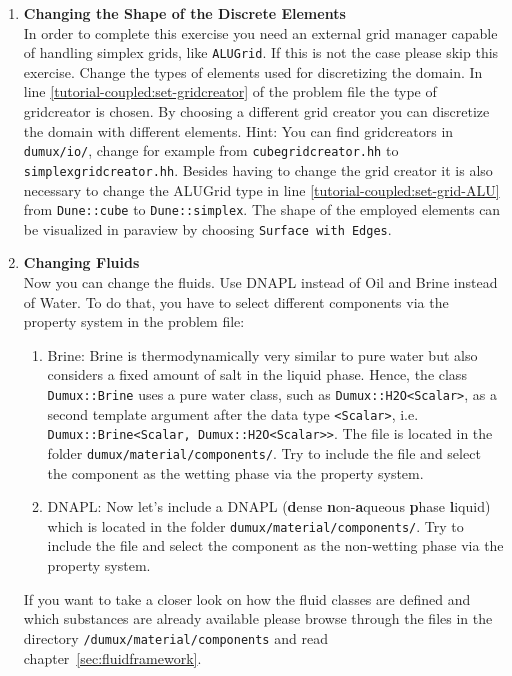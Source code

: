 \begin{enumerate}
  \item \textbf{Changing  the Shape of the Discrete Elements} \\
  In order to complete this exercise you need an external grid manager capable of handling 
  simplex grids, like \texttt{ALUGrid}. If this is not the case please skip this exercise.
  Change the types of elements used for discretizing the domain. In line \ref{tutorial-coupled:set-gridcreator} of the problem 
  file  the type of gridcreator is chosen. By choosing a different grid creator you can discretize the domain with different elements. 
  Hint: You can find gridcreators in \texttt{dumux/io/}, change for example from \texttt{cubegridcreator.hh} to \texttt{simplexgridcreator.hh}. 
  Besides having to change the grid creator it is also necessary to change the ALUGrid type in line \ref{tutorial-coupled:set-grid-ALU} from \texttt{Dune::cube} 
  to \texttt{Dune::simplex}.
  The shape of the employed elements can be visualized in paraview by choosing \texttt{Surface with Edges}. 

\item \textbf{Changing Fluids} \\
Now you can change the fluids. Use DNAPL instead of Oil and Brine instead of Water. To do that, you have to select different components via the property system in the problem file:
\begin{enumerate}
 \item Brine: Brine is thermodynamically very similar to pure water but also considers a fixed amount of salt in the liquid phase. 
  Hence, the class \texttt{Dumux::Brine} uses a pure water class, such as \texttt{Dumux::H2O<Scalar>}, 
  as a second template argument after the data type \texttt{<Scalar>}, i.e. \texttt{Dumux::Brine<Scalar, Dumux::H2O<Scalar>>}. The file is located in the folder \texttt{dumux/material/components/}.
  Try to include the file and select the component as the wetting phase via the property system.
 \item DNAPL:  
  Now let's include a DNAPL (\textbf{d}ense \textbf{n}on-\textbf{a}queous \textbf{p}hase \textbf{l}iquid)
  which is located in the folder \texttt{dumux/material/components/}. Try to include the file and select the component as the non-wetting phase via the property system.
\end{enumerate}
If you want to take a closer look on how the fluid classes are defined and which substances are already available please browse through the files in the directory
\texttt{/dumux/material/components} and read chapter~\ref{sec:fluidframework}.


\end{enumerate}
